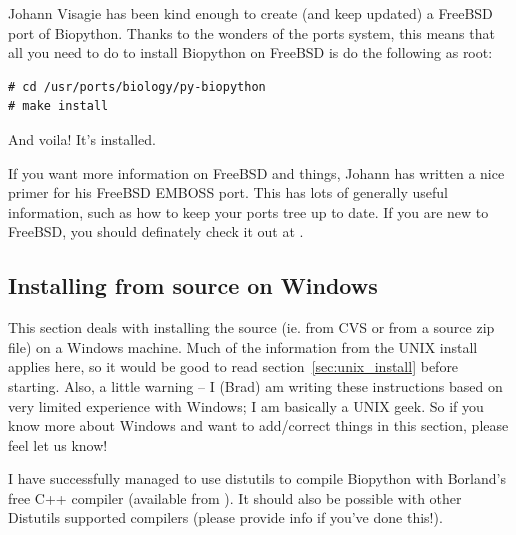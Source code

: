 \documentclass{report}
\begin{document}
Johann Visagie has been kind enough to create (and keep updated) a FreeBSD port of Biopython. Thanks to the wonders of the ports system, this means that all you need to do to install Biopython on FreeBSD is do the following as root:

\begin{verbatim}
# cd /usr/ports/biology/py-biopython
# make install
\end{verbatim}

And voila! It's installed. 


If you want more information on FreeBSD and things, Johann has written a nice primer for his FreeBSD EMBOSS port. This has lots of generally useful information, such as how to keep your ports tree up to date. If you are new to FreeBSD, you should definately check it out at .

\subsection{Installing from source on Windows}
\label{sec:windows_install}

This section deals with installing the source (ie. from CVS or from a source zip file) on a Windows machine. Much of the information from the UNIX install applies here, so it would be good to read section~\ref{sec:unix_install} before starting. Also, a little warning -- I (Brad) am writing these instructions based on very limited experience with Windows; I am basically a UNIX geek. So if you know more about Windows and want to add/correct things in this section, please feel let us know!


I have successfully managed to use distutils to compile Biopython with Borland's free C++ compiler (available from ). It should also be possible with other Distutils supported compilers (please provide info if you've done this!).
\end{document}
